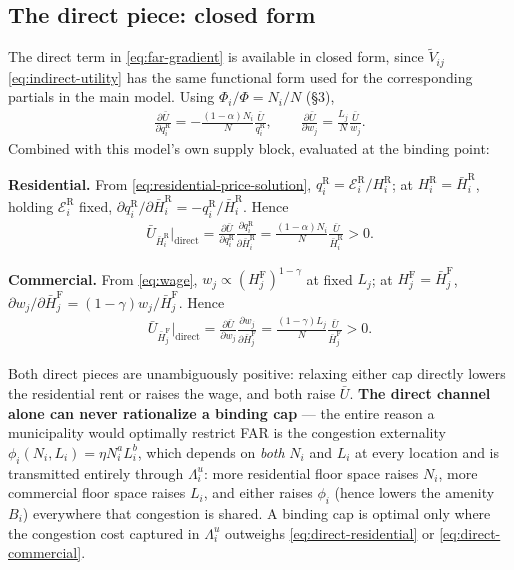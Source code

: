 \documentclass[12pt,a4paper]{article}
\newcommand{\R}{\mathrm{R}}
\newcommand{\F}{\mathrm{F}}
\newcommand{\1}{\mathbb 1}
\begin{document}
\subsection{The direct piece: closed form}

The direct term in \eqref{eq:far-gradient} is available in closed form, since $\widetilde V_{ij}$ \eqref{eq:indirect-utility} has the same functional form used for the corresponding partials in the main model. Using $\Phi_i/\Phi=N_i/N$ (\S3),
\begin{align}
\frac{\partial \bar U}{\partial q_i^{\R}}=-\frac{(1-\alpha)N_i}{N}\frac{\bar U}{q_i^{\R}},
\qquad
\frac{\partial \bar U}{\partial w_j}=\frac{L_j}{N}\frac{\bar U}{w_j}.
\label{eq:direct-partials}
\end{align}
Combined with this model's own supply block, evaluated at the binding point:

\textbf{Residential.} From \eqref{eq:residential-price-solution}, $q_i^{\R}=\mathcal E_i^{\R}/H_i^{\R}$; at $H_i^{\R}=\bar H_i^{\R}$, holding $\mathcal E_i^{\R}$ fixed, $\partial q_i^{\R}/\partial\bar H_i^{\R}=-q_i^{\R}/\bar H_i^{\R}$. Hence
\begin{align}
\bar U_{\bar H_i^{\R}}\Big|_{\text{direct}}
=
\frac{\partial \bar U}{\partial q_i^{\R}}\frac{\partial q_i^{\R}}{\partial\bar H_i^{\R}}
=
\frac{(1-\alpha)N_i}{N}\frac{\bar U}{\bar H_i^{\R}}
>0.
\label{eq:direct-residential}
\end{align}

\textbf{Commercial.} From \eqref{eq:wage}, $w_j\propto(H_j^{\F})^{1-\gamma}$ at fixed $L_j$; at $H_j^{\F}=\bar H_j^{\F}$, $\partial w_j/\partial\bar H_j^{\F}=(1-\gamma)w_j/\bar H_j^{\F}$. Hence
\begin{align}
\bar U_{\bar H_j^{\F}}\Big|_{\text{direct}}
=
\frac{\partial \bar U}{\partial w_j}\frac{\partial w_j}{\partial\bar H_j^{\F}}
=
\frac{(1-\gamma)L_j}{N}\frac{\bar U}{\bar H_j^{\F}}
>0.
\label{eq:direct-commercial}
\end{align}

Both direct pieces are unambiguously positive: relaxing either cap directly lowers the residential rent or raises the wage, and both raise $\bar U$. \textbf{The direct channel alone can never rationalize a binding cap} — the entire reason a municipality would optimally restrict FAR is the congestion externality $\phi_i(N_i,L_i)=\eta N_i^aL_i^b$, which depends on \emph{both} $N_i$ and $L_i$ at every location and is transmitted entirely through $\Lambda_i^u$: more residential floor space raises $N_i$, more commercial floor space raises $L_i$, and either raises $\phi_i$ (hence lowers the amenity $B_i$) everywhere that congestion is shared. A binding cap is optimal only where the congestion cost captured in $\Lambda_i^u$ outweighs \eqref{eq:direct-residential} or \eqref{eq:direct-commercial}.
\end{document}
